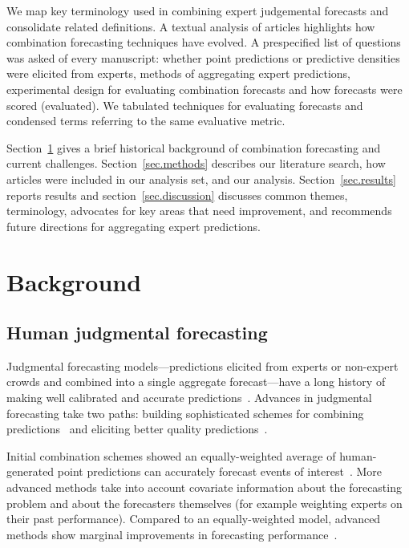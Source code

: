\documentclass[preprint,authoryear,nonatbib]{elsarticle}
\begin{document}
We map key terminology used in combining expert judgemental forecasts and consolidate related definitions.
A textual analysis of articles highlights how combination forecasting techniques have evolved.
A prespecified list of questions was asked of every manuscript: whether point predictions or predictive densities were elicited from experts, methods of aggregating expert predictions, experimental design for evaluating combination forecasts and how forecasts were scored (evaluated).
We tabulated techniques for evaluating forecasts and condensed terms referring to the same evaluative metric.

Section~\ref{background} gives a brief historical background of combination forecasting and current challenges.
Section~\ref{sec.methods} describes our literature search, how articles were included in our analysis set, and our analysis.
Section~\ref{sec.results} reports results and section~\ref{sec.discussion} discusses common themes, terminology, advocates for key areas that need improvement, and recommends future directions for aggregating expert predictions.

\section{Background}
\label{background}

\subsection{Human judgmental forecasting}

Judgmental forecasting models---predictions elicited from experts or non-expert crowds and combined into a single aggregate forecast---have a long history of making well calibrated and accurate predictions~\parencite{edmundson1990decomposition,bunn1991interaction,lawrence1992exploring,o1993judgemental}.
Advances in judgmental forecasting take two paths: building sophisticated schemes for combining predictions~\parencite{clemen1989combining,clemen1999combining,clemen2008comment} and eliciting better quality predictions~\parencite{ayyub2001elicitation,helmer1967analysis}. 

Initial combination schemes showed an equally-weighted average of human-generated point predictions can accurately forecast events of interest~\parencite{galton1907vox}.
More advanced methods take into account covariate information about the forecasting problem and about the forecasters themselves (for example weighting experts on their past performance).
Compared to an equally-weighted model, advanced methods show marginal improvements in forecasting performance~\parencite{fischer1999combining,mclaughlin1973forecasters,armstrong1985crystal,winkler1971probabilistic,clemen1989combining}.
\end{document}
